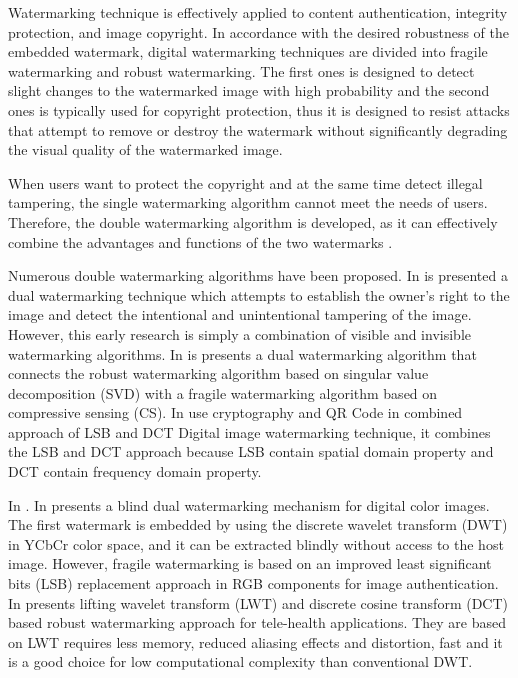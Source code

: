 \documentclass[runningheads]{llncs}
\begin{document}
Watermarking technique is effectively applied to content authentication, integrity protection, and image copyright. In accordance with the desired robustness of the embedded watermark, digital watermarking techniques are divided into fragile watermarking and robust watermarking. The first ones is designed to detect slight changes to the watermarked image with high probability and the second ones is typically used for copyright protection, thus it is designed to resist attacks that attempt to remove or destroy the watermark without significantly degrading the visual quality of the watermarked image.

When users want to protect the copyright and at the same time detect illegal tampering, the single watermarking algorithm cannot meet the needs of users. Therefore, the double watermarking algorithm is developed, as it can effectively combine the advantages and functions of the two watermarks \cite{wang2017dual}.

Numerous double watermarking algorithms have been proposed. In \cite{mohanty1999dual} is presented a dual watermarking technique which attempts to establish the owner’s right to the image and detect the intentional and unintentional tampering of the image. However, this early research is simply a combination of visible and invisible watermarking algorithms. In \cite{wang2017dual} is presents a dual watermarking algorithm that connects the robust watermarking algorithm based on singular value decomposition (SVD) with a fragile watermarking algorithm based on compressive sensing (CS). In \cite{singh2018hybrid} use cryptography and QR Code in combined approach of LSB and DCT Digital image watermarking technique, it combines the LSB and DCT approach because LSB contain spatial domain property and DCT contain frequency domain property.

In \cite{shivani2017dual}. In \cite{liu2018blind} presents a blind dual watermarking mechanism for digital color images. The first watermark is embedded by using the discrete wavelet transform (DWT) in YCbCr color space, and it can be extracted blindly without access to the host image. However, fragile watermarking is based on an improved least significant bits (LSB) replacement approach in RGB components for image authentication. In \cite{singh2019robust} presents lifting wavelet transform (LWT) and discrete cosine transform (DCT) based robust watermarking approach for tele-health applications. They are based on LWT requires less memory, reduced aliasing effects and distortion, fast and it is a good choice for low computational complexity than conventional DWT.
\end{document}
